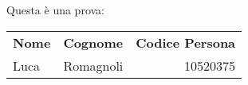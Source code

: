 \documentclass{article}
\begin{document}
	Questa è una prova:
	\\
	\begin{center}
		\begin{tabular}{lcr}
			{\bf Nome}&{\bf Cognome}&{\bf Codice Persona}
			\\Luca&Romagnoli&10520375
		\end{tabular}
	\end{center}
\end{document}
